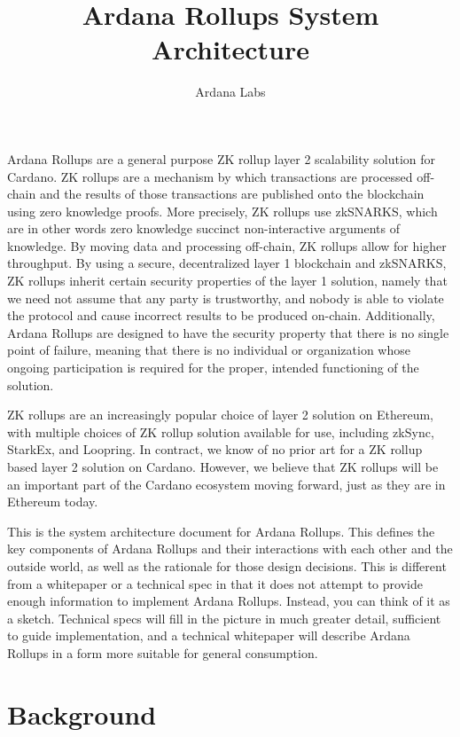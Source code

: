 \documentclass[12pt]{article}
\title{Ardana Rollups System Architecture}
\author{Ardana Labs}
\begin{document}
\maketitle


Ardana Rollups are a general purpose ZK rollup layer 2 scalability solution for Cardano. ZK rollups are a mechanism by which transactions are processed off-chain and the results of those transactions are published onto the blockchain using zero knowledge proofs. More precisely, ZK rollups use zkSNARKS, which are in other words zero knowledge succinct non-interactive arguments of knowledge. By moving data and processing off-chain, ZK rollups allow for higher throughput. By using a secure, decentralized layer 1 blockchain and zkSNARKS, ZK rollups inherit certain security properties of the layer 1 solution, namely that we need not assume that any party is trustworthy, and nobody is able to violate the protocol and cause incorrect results to be produced on-chain. Additionally, Ardana Rollups are designed to have the security property that there is no single point of failure, meaning that there is no individual or organization whose ongoing participation is required for the proper, intended functioning of the solution.

ZK rollups are an increasingly popular choice of layer 2 solution on Ethereum, with multiple choices of ZK rollup solution available for use, including zkSync, StarkEx, and Loopring. \cite{ethworks-20} In contract, we know of no prior art for a ZK rollup based layer 2 solution on Cardano. However, we believe that ZK rollups will be an important part of the Cardano ecosystem moving forward, just as they are in Ethereum today.

This is the system architecture document for Ardana Rollups. This defines the key components of Ardana Rollups and their interactions with each other and the outside world, as well as the rationale for those design decisions. This is different from a whitepaper or a technical spec in that it does not attempt to provide enough information to implement Ardana Rollups. Instead, you can think of it as a sketch. Technical specs will fill in the picture in much greater detail, sufficient to guide implementation, and a technical whitepaper will describe Ardana Rollups in a form more suitable for general consumption.

\section{Background}
\end{document}

